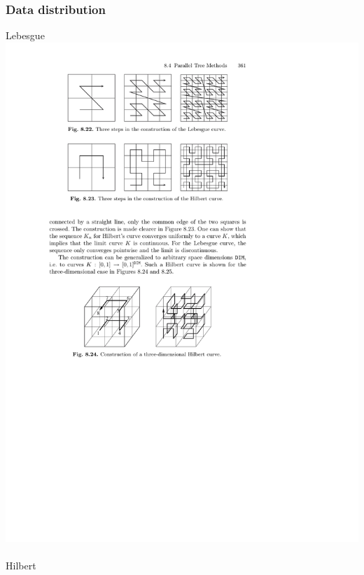 \documentclass[mathserif, 10pt]{beamer}
\begin{document}
\begin{frame}
    \frametitle{Data distribution}
    \begin{minipage}[b]{0.40\linewidth}
	Lebesgue
	\includegraphics[viewport = 105 705 375 795, scale=0.6, clip]{figures/hilbertCurve.pdf}
	\ \\
	Hilbert

\end{minipage}
\end{frame}
\end{document}
